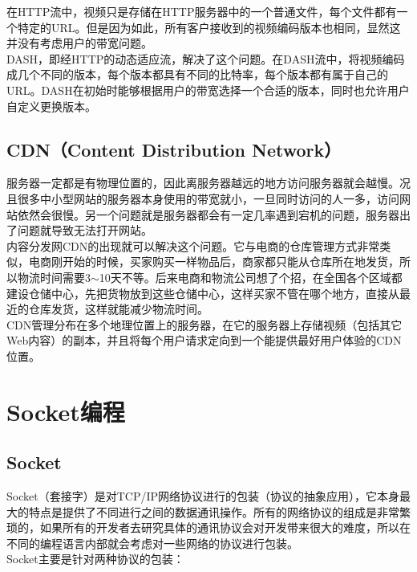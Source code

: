 在HTTP流中，视频只是存储在HTTP服务器中的一个普通文件，每个文件都有一个特定的URL。但是因为如此，所有客户接收到的视频编码版本也相同，显然这并没有考虑用户的带宽问题。\\

DASH，即经HTTP的动态适应流，解决了这个问题。在DASH流中，将视频编码成几个不同的版本，每个版本都具有不同的比特率，每个版本都有属于自己的URL。DASH在初始时能够根据用户的带宽选择一个合适的版本，同时也允许用户自定义更换版本。\\

\subsection{CDN（Content Distribution Network）}

服务器一定都是有物理位置的，因此离服务器越远的地方访问服务器就会越慢。况且很多中小型网站的服务器本身使用的带宽就小，一旦同时访问的人一多，访问网站依然会很慢。另一个问题就是服务器都会有一定几率遇到宕机的问题，服务器出了问题就导致无法打开网站。\\

内容分发网CDN的出现就可以解决这个问题。它与电商的仓库管理方式非常类似，电商刚开始的时候，买家购买一样物品后，商家都只能从仓库所在地发货，所以物流时间需要3$ \sim $10天不等。后来电商和物流公司想了个招，在全国各个区域都建设仓储中心，先把货物放到这些仓储中心，这样买家不管在哪个地方，直接从最近的仓库发货，这样就能减少物流时间。\\

CDN管理分布在多个地理位置上的服务器，在它的服务器上存储视频（包括其它Web内容）的副本，并且将每个用户请求定向到一个能提供最好用户体验的CDN位置。

\newpage

\section{Socket编程}

\subsection{Socket}

Socket（套接字）是对TCP/IP网络协议进行的包装（协议的抽象应用），它本身最大的特点是提供了不同进行之间的数据通讯操作。所有的网络协议的组成是非常繁琐的，如果所有的开发者去研究具体的通讯协议会对开发带来很大的难度，所以在不同的编程语言内部就会考虑对一些网络的协议进行包装。\\

Socket主要是针对两种协议的包装：

